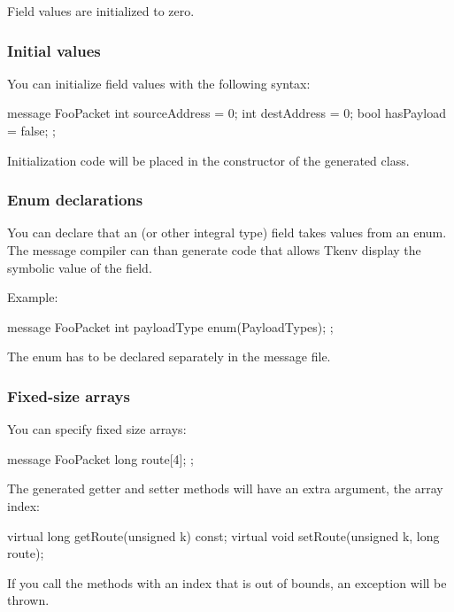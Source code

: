 Field values are initialized to zero.


\subsubsection{Initial values}

You can initialize field values with the following syntax:

\begin{msg}
message FooPacket
{
    int sourceAddress = 0;
    int destAddress = 0;
    bool hasPayload = false;
};
\end{msg}

Initialization code will be placed in the constructor of the generated class.


\subsubsection{Enum declarations}

You can declare that an  (or other integral type) field
takes values from an enum. The message compiler can than generate code
that allows Tkenv display the symbolic value of the field.

Example:

\begin{msg}
message FooPacket
{
    int payloadType enum(PayloadTypes);
};
\end{msg}

The enum has to be declared separately in the message file.


\subsubsection{Fixed-size arrays}

You can specify fixed size arrays:

\begin{msg}
message FooPacket
{
    long route[4];
};
\end{msg}

The generated getter and setter methods will have an extra  argument,
the array index:

\begin{cpp}
virtual long getRoute(unsigned k) const;
virtual void setRoute(unsigned k, long route);
\end{cpp}

If you call the methods with an index that is out of bounds, an exception
will be thrown.


